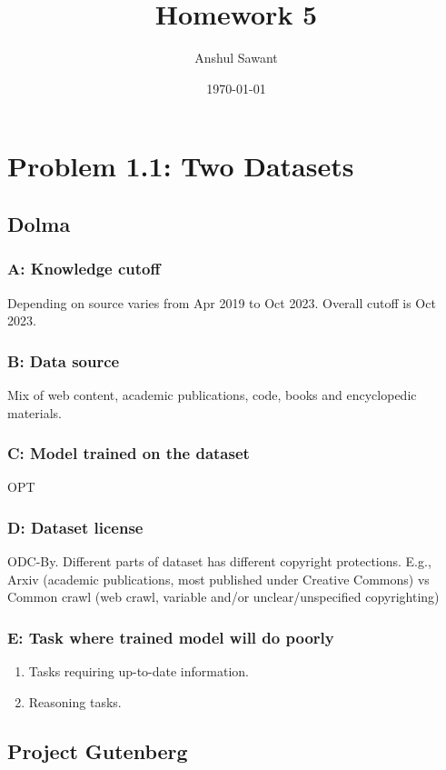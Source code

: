 \documentclass[11pt]{article}
\author{Anshul Sawant}
\date{\today}
\title{Homework 5}
\begin{document}
\maketitle
\tableofcontents

\section{Problem 1.1: Two Datasets}
\label{sec:org06c1b54}
\subsection{Dolma}
\label{sec:org3742216}
\subsubsection{A: Knowledge cutoff}
\label{sec:org058539c}
Depending on source varies from Apr 2019 to Oct 2023. Overall cutoff is Oct 2023.
\subsubsection{B: Data source}
\label{sec:org2fdadf5}
Mix of web content, academic publications, code, books and encyclopedic materials.
\subsubsection{C: Model trained on the dataset}
\label{sec:org05835a2}
OPT
\subsubsection{D: Dataset license}
\label{sec:org347690c}
ODC-By. Different parts of dataset has different copyright protections. E.g., Arxiv (academic publications, most published under Creative Commons) vs Common crawl (web crawl, variable and/or unclear/unspecified copyrighting)
\subsubsection{E: Task where trained model will do poorly}
\label{sec:org3db87d9}
\begin{enumerate}
\item Tasks requiring up-to-date information.
\item Reasoning tasks.
\end{enumerate}

\subsection{Project Gutenberg}
\label{sec:org5860681}
\end{document}
